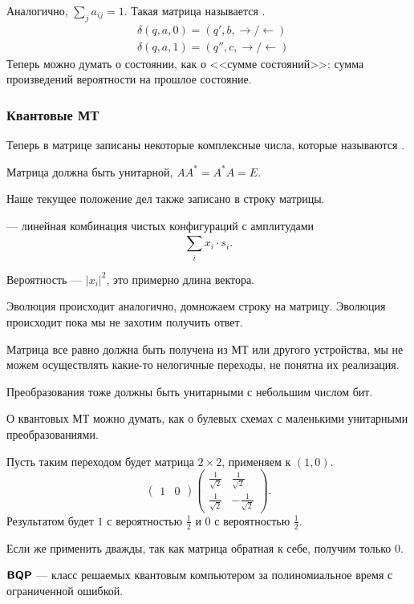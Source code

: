 Аналогично, $ \sum_{j}^{} a_{ij} = 1$.  Такая матрица называется .
\[
\begin{aligned}
	&\delta (q, a, 0) = (q', b , \to / \leftarrow  ) \\
	& \delta (q, a, 1) = (q'', c, \to / \leftarrow  )
\end{aligned}
\]
Теперь можно думать о состоянии, как о <<сумме состояний>>: сумма произведений вероятности на прошлое состояние. 

\subsubsection{Квантовые МТ}
Теперь в матрице записаны некоторые комплексные числа, которые называются . 

Матрица должна быть унитарной, $ A A^{*} = A^{*} A = E$. 

Наше текущее положение дел также записано в строку матрицы.

 --- линейная комбинация чистых конфигураций с амплитудами
\[
\sum_{i}^{} x_i \cdot s_i
.\] 

Вероятность --- $ \lvert x_i \rvert ^2$, это примерно длина вектора.

Эволюция происходит аналогично, домножаем строку на матрицу.
Эволюция происходит пока мы не захотим получить ответ.

Матрица все равно должна быть получена из МТ или другого устройства, мы не можем осуществлять какие-то нелогичные переходы, не понятна их реализация.

Преобразования тоже должны быть унитарными с небольшим числом бит.

О квантовых МТ можно думать, как о булевых схемах с маленькими унитарными преобразованиями. 
\begin{ex}
	Пусть таким переходом будет матрица $ 2\times 2$, применяем к $ (1, 0)$. 
	\[
		\begin{pmatrix}
			1 & 0
		\end{pmatrix}
	\begin{pmatrix}
		\frac{1}{\sqrt{ 2} }& \frac{1}{\sqrt{ 2} }\\
		\frac{1}{\sqrt{ 2} }& -\frac{1}{\sqrt{ 2} }
	\end{pmatrix}
	.\] 
	Результатом будет $ 1$ с вероятностью $ \tfrac{1}{2}$ и $ 0$ с вероятностью $ \frac{1}{2}$.

	Если же применить дважды, так как матрица обратная к себе, получим только $ 0$.
\end{ex}

\begin{defn}\index{\BQP}
$ \textmd{\textbf{\textsf{BQP}}}$ --- класс решаемых квантовым компьютером за полиномиальное время  с ограниченной ошибкой.
\end{defn}
